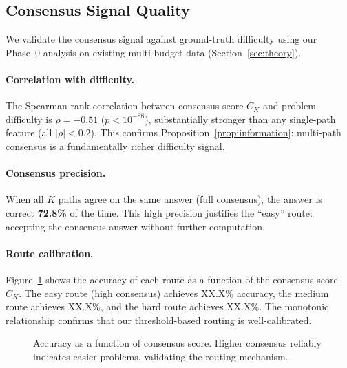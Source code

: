 \subsection{Consensus Signal Quality}
\label{sec:analysis:consensus}

We validate the consensus signal against ground-truth difficulty using our Phase~0 analysis on existing multi-budget data (Section~\ref{sec:theory}).

\paragraph{Correlation with difficulty.}
The Spearman rank correlation between consensus score $C_K$ and problem difficulty is $\rho = -0.51$ ($p < 10^{-88}$), substantially stronger than any single-path feature (all $|\rho| < 0.2$).
This confirms Proposition~\ref{prop:information}: multi-path consensus is a fundamentally richer difficulty signal.

\paragraph{Consensus precision.}
When all $K$ paths agree on the same answer (full consensus), the answer is correct \textbf{72.8\%} of the time.
This high precision justifies the ``easy'' route: accepting the consensus answer without further computation.

\paragraph{Route calibration.}
Figure~\ref{fig:route_calibration} shows the accuracy of each route as a function of the consensus score $C_K$.
The easy route (high consensus) achieves XX.X\% accuracy, the medium route achieves XX.X\%, and the hard route achieves XX.X\%.
The monotonic relationship confirms that our threshold-based routing is well-calibrated.

\begin{figure}[h]
\centering
\caption{Accuracy as a function of consensus score. Higher consensus reliably indicates easier problems, validating the routing mechanism.}
\label{fig:route_calibration}
\end{figure}

